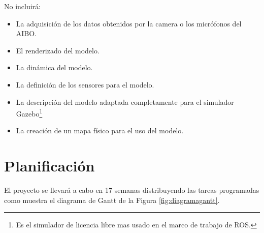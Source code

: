 \documentclass[12pt,a4paper,final,twoside]{book}
\begin{document}
No incluirá:
\begin{itemize}
\item La adquisición de los datos obtenidos por la camera o los micrófonos del AIBO.
\item El renderizado del modelo.
\item La dinámica del modelo.
\item La definición de los sensores para el modelo.
\item La descripción del modelo adaptada completamente para el simulador Gazebo\footnote{Es el simulador de licencia libre mas usado en el marco de trabajo de ROS.}
\item La creación de un mapa físico para el uso del modelo.
\end{itemize}

\section{Planificación}
El proyecto se llevará a cabo en 17 semanas  distribuyendo las tareas programadas como muestra el diagrama de Gantt de la Figura \ref{fig:diagramagantt}.
\end{document}
